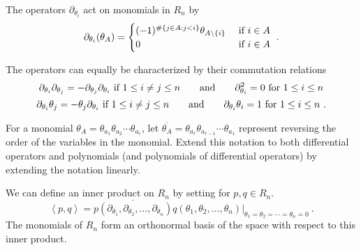 \documentclass[11pt,oneside]{amsart}
\theoremstyle{definition}
\numberwithin{equation}{section}
\begin{document}
The operators $\partial_{\theta_i}$ act on monomials in $R_n$
by
\[
\partial_{\theta_i}( \theta_A ) = \begin{cases}
(-1)^{\#\{ j \in A: j<i\}}\theta_{A \backslash \{i\}}&\hbox{ if }i \in A\\
0&\hbox{ if }i \in A
\end{cases}~.
\]

The operators can equally be characterized by their commutation
relations
\[
\partial_{\theta_i} \partial_{\theta_j}=-\partial_{\theta_j} \partial_{\theta_i}
\hbox{ if } 1 \leq i \neq j \leq n
\qquad\hbox{and}\qquad
\partial_{\theta_i}^2 = 0\hbox{ for }1 \leq i \leq n
\]
\[
\partial_{\theta_i} \theta_j=-\theta_j \partial_{\theta_i}
\hbox{ if } 1 \leq i \neq j \leq n
\qquad\hbox{and}\qquad
\partial_{\theta_i} \theta_i = 1\hbox{ for }1 \leq i \leq n~.
\]

For a monomial $\theta_A = \theta_{a_1} \theta_{a_2} \cdots \theta_{a_r}$,
let $\overline{\theta_A} = \theta_{a_r} \theta_{a_{r-1}} \cdots \theta_{a_1}$ represent
reversing the order of the variables in the monomial.  Extend this notation to both
differential operators and polynomials (and polynomials of differential operators)
by extending the notation linearly.

We can define an inner product on $R_n$ by setting for $p,q \in R_n$.
\[
\left< p, q \right> = \overline{p(\partial_{\theta_1}, \partial_{\theta_2}, \ldots, \partial_{\theta_n})}
q( \theta_1, \theta_2, \ldots, \theta_n)|_{\theta_1=\theta_2 = \cdots=\theta_n=0}~.
\]
The monomials of $R_n$ form an orthonormal basis of the space with respect to this
inner product.
\end{document}
